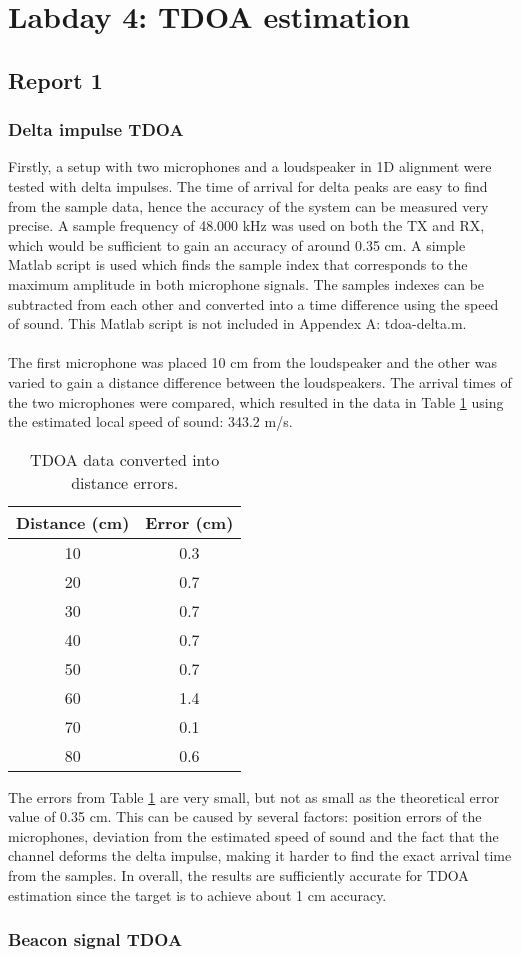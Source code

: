 \documentclass[final]{scrreprt} %
\begin{document}
\section{Labday 4: TDOA estimation}
\subsection{Report 1}
\subsubsection{Delta impulse TDOA}
Firstly, a setup with two microphones and a loudspeaker in 1D alignment were tested with delta impulses.
The time of arrival for delta peaks are easy to find from the sample data, hence the accuracy of the system can be measured very precise.
A sample frequency of 48.000 kHz was used on both the TX and RX, which would be sufficient to gain an accuracy of around 0.35 cm.
A simple Matlab script is used which finds the sample index that corresponds to the maximum amplitude in both microphone signals.
The samples indexes can be subtracted from each other and converted into a time difference using the speed of sound.
This Matlab script is not included in Appendex A: tdoa-delta.m.
\\ \\
The first microphone was placed 10 cm from the loudspeaker and the other was varied to gain a distance difference between the loudspeakers.
The arrival times of the two microphones were compared, which resulted in the data in Table \ref{tab:delta} using the estimated local speed of sound: 343.2 m/s.

\begin{table} [H]
	\centering
	\begin{tabular} { c | c }
	Distance (cm) & Error (cm) \\ \hline
	10 & 0.3 \\
	20 & 0.7 \\
	30 & 0.7 \\
	40 & 0.7 \\
	50 & 0.7 \\
	60 & 1.4 \\
	70 & 0.1 \\
	80 & 0.6 \\
	\end{tabular}
\caption{TDOA data converted into distance errors.}
\label{tab:delta}
\end{table}

The errors from Table \ref{tab:delta} are very small, but not as small as the theoretical error value of 0.35 cm.
This can be caused by several factors: position errors of the microphones, deviation from the estimated speed of sound and the fact that the channel deforms the delta impulse, making it harder to find the exact arrival time from the samples.
In overall, the results are sufficiently accurate for TDOA estimation since the target is to achieve about 1 cm accuracy.

\subsubsection{Beacon signal TDOA}
\end{document}
